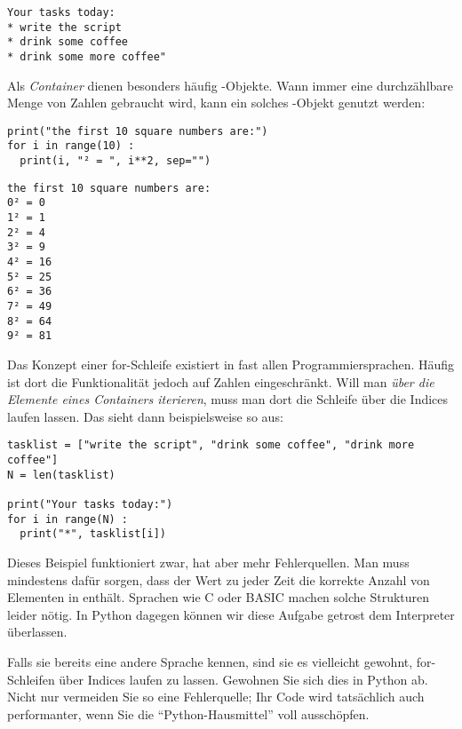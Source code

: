 \begin{cmdbox}
\begin{verbatim}
Your tasks today:
* write the script
* drink some coffee
* drink some more coffee"
\end{verbatim}
\end{cmdbox}

Als \emph{Container} dienen besonders häufig -Objekte. Wann immer eine durchzählbare Menge von Zahlen gebraucht wird, kann ein solches -Objekt genutzt werden:

\begin{codebox}
\begin{verbatim}
print("the first 10 square numbers are:")
for i in range(10) :
  print(i, "² = ", i**2, sep="")
\end{verbatim}
\end{codebox}

\begin{cmdbox}
\begin{verbatim}
the first 10 square numbers are:
0² = 0
1² = 1
2² = 4
3² = 9
4² = 16
5² = 25
6² = 36
7² = 49
8² = 64
9² = 81
\end{verbatim}
\end{cmdbox}

\begin{hintbox}
Das Konzept einer for-Schleife existiert in fast allen Programmiersprachen. Häufig ist dort die Funktionalität jedoch auf Zahlen eingeschränkt. Will man \emph{über die Elemente eines Containers iterieren}, muss man dort die Schleife über die Indices laufen lassen. Das sieht dann beispielsweise so aus:

\begin{codebox}
\begin{verbatim}
tasklist = ["write the script", "drink some coffee", "drink more coffee"]
N = len(tasklist)

print("Your tasks today:")
for i in range(N) :
  print("*", tasklist[i])
\end{verbatim}
\end{codebox}

Dieses Beispiel funktioniert zwar, hat aber mehr Fehlerquellen. Man muss mindestens dafür sorgen, dass der Wert  zu jeder Zeit die korrekte Anzahl von Elementen in  enthält. Sprachen wie C oder BASIC machen solche Strukturen leider nötig. In Python dagegen können wir diese Aufgabe getrost dem Interpreter überlassen.

Falls sie bereits eine andere Sprache kennen, sind sie es vielleicht gewohnt, for-Schleifen über Indices laufen zu lassen. Gewohnen Sie sich dies in Python ab. Nicht nur vermeiden Sie so eine Fehlerquelle; Ihr Code wird tatsächlich auch performanter, wenn Sie die \enquote{Python-Hausmittel} voll ausschöpfen.
\end{hintbox}

